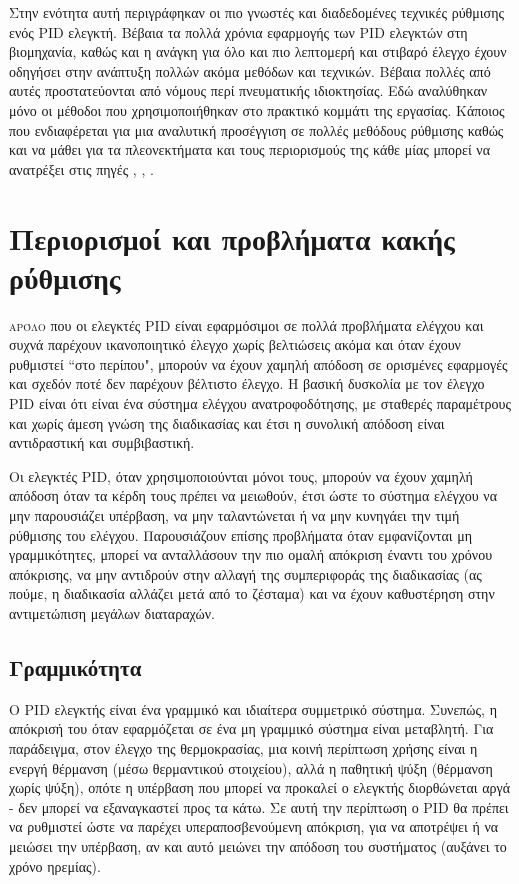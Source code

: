 Στην ενότητα αυτή περιγράφηκαν οι πιο γνωστές και διαδεδομένες τεχνικές ρύθμισης ενός PID ελεγκτή. Βέβαια τα πολλά χρόνια εφαρμογής των PID ελεγκτών στη βιομηχανία, καθώς και η ανάγκη για όλο και πιο λεπτομερή και στιβαρό έλεγχο έχουν οδηγήσει στην ανάπτυξη πολλών ακόμα μεθόδων και τεχνικών. Βέβαια πολλές από αυτές προστατεύονται από νόμους περί πνευματικής ιδιοκτησίας. Εδώ αναλύθηκαν μόνο οι μέθοδοι που χρησιμοποιήθηκαν στο πρακτικό κομμάτι της εργασίας. Κάποιος που ενδιαφέρεται για μια αναλυτική προσέγγιση σε πολλές μεθόδους ρύθμισης καθώς και να μάθει για τα πλεονεκτήματα και τους περιορισμούς της κάθε μίας μπορεί να ανατρέξει στις πηγές \cite{astrom}, \cite{yun}, \cite{kristian}.

\section{Περιορισμοί και προβλήματα κακής ρύθμισης}

\lettrine[findent=2pt]{}{αρόλο} που οι ελεγκτές PID είναι εφαρμόσιμοι σε πολλά προβλήματα ελέγχου και συχνά παρέχουν ικανοποιητικό έλεγχο χωρίς βελτιώσεις ακόμα και όταν έχουν ρυθμιστεί ``στο περίπου", μπορούν να έχουν χαμηλή απόδοση σε ορισμένες εφαρμογές και σχεδόν ποτέ δεν παρέχουν βέλτιστο έλεγχο. Η βασική δυσκολία με τον έλεγχο PID είναι ότι είναι ένα σύστημα ελέγχου ανατροφοδότησης, με σταθερές παραμέτρους και χωρίς άμεση γνώση της διαδικασίας και έτσι η συνολική απόδοση είναι αντιδραστική και συμβιβαστική.

Οι ελεγκτές PID, όταν χρησιμοποιούνται μόνοι τους, μπορούν να έχουν χαμηλή απόδοση όταν τα κέρδη τους πρέπει να μειωθούν, έτσι ώστε το σύστημα ελέγχου να μην παρουσιάζει υπέρβαση, να μην ταλαντώνεται ή να μην κυνηγάει την τιμή ρύθμισης του ελέγχου. Παρουσιάζουν επίσης προβλήματα όταν εμφανίζονται μη γραμμικότητες, μπορεί να ανταλλάσουν την πιο ομαλή απόκριση έναντι του χρόνου απόκρισης, να μην αντιδρούν στην αλλαγή της συμπεριφοράς της διαδικασίας (ας πούμε, η διαδικασία αλλάζει μετά από το ζέσταμα) και να έχουν καθυστέρηση στην αντιμετώπιση μεγάλων διαταραχών.

\subsection{Γραμμικότητα}

Ο PID ελεγκτής είναι ένα γραμμικό και ιδιαίτερα συμμετρικό σύστημα. Συνεπώς, η απόκρισή του όταν εφαρμόζεται σε ένα μη γραμμικό σύστημα είναι μεταβλητή. Για παράδειγμα, στον έλεγχο της θερμοκρασίας, μια κοινή περίπτωση χρήσης είναι η ενεργή θέρμανση (μέσω θερμαντικού στοιχείου), αλλά η παθητική ψύξη (θέρμανση χωρίς ψύξη), οπότε η υπέρβαση που μπορεί να προκαλεί ο ελεγκτής διορθώνεται αργά - δεν μπορεί να εξαναγκαστεί προς τα κάτω. Σε αυτή την περίπτωση ο PID θα πρέπει να ρυθμιστεί ώστε να παρέχει υπεραποσβενούμενη απόκριση, για να αποτρέψει ή να μειώσει την υπέρβαση, αν και αυτό μειώνει την απόδοση του συστήματος (αυξάνει το χρόνο ηρεμίας).


